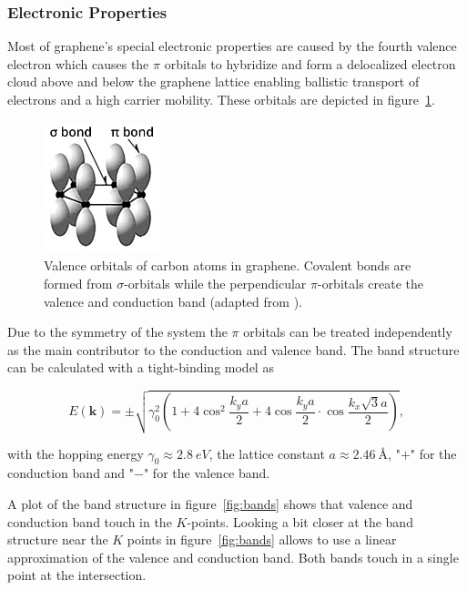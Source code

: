 \newpage

\subsubsection{Electronic Properties}

Most of graphene's special electronic properties are caused by the fourth valence electron which causes the $\pi$ orbitals to hybridize and form a delocalized electron cloud above and below the graphene lattice enabling ballistic transport of electrons and a high carrier mobility\cite{carrier}. These orbitals are depicted in figure~\ref{fig:orbitals}.

\begin{figure}[!h]
  \centering
  \includegraphics[width=0.3\textwidth]{./images/orbitals.png}
  \caption{Valence orbitals of carbon atoms in graphene. Covalent bonds are formed from $\sigma$-orbitals while the perpendicular $\pi$-orbitals create the valence and conduction band (adapted from \cite{orbitals}).}
  \label{fig:orbitals}
\end{figure}

Due to the symmetry of the system the $\pi$ orbitals can be treated independently as the main contributor to the conduction and valence band. The band structure can be calculated with a tight-binding model as\cite{dispersion}

\begin{equation}
  E(\mathbf{k})=\pm\sqrt{\gamma_0^2\left(1+4\cos^2\frac{k_ya}{2}+4\cos\frac{k_ya}{2}\cdot\cos\frac{k_x\sqrt{3}a}{2}\right)},
  \label{eq:dispersion}
\end{equation}

with the hopping energy $\gamma_0\approx\SI{2.8}{eV}$\cite{dispersion}, the lattice constant $a\approx\SI{2.46}{Å}$, "$+$" for the conduction band and "$-$" for the valence band.

A plot of the band structure in figure~\ref{fig:bands} shows that valence and conduction band touch in the $K$-points. Looking a bit closer at the band structure near the $K$ points in figure~\ref{fig:bands} allows to use a linear approximation of the valence and conduction band. Both bands touch in a single point at the intersection.

